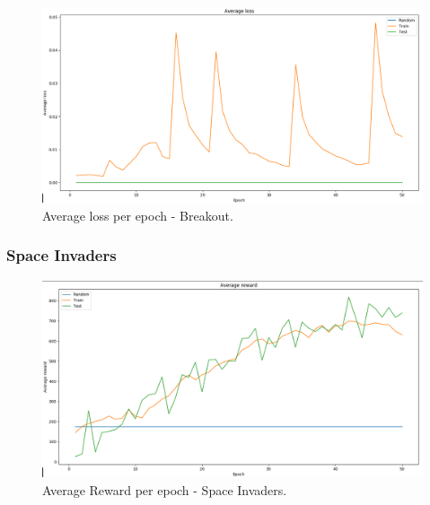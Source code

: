 \documentclass[a4paper,11pt]{report}
\begin{document}
			\begin{figure}[H]
				\begin{centering}
					\includegraphics[width=15cm]{images/breakout_4_averageloss.png}
					\caption{Average loss per epoch - Breakout.}
				\end{centering}
			\end{figure}			
			
			\newpage
			\subsubsection{Space Invaders}

			\begin{figure}[H]
				\begin{centering}
					\includegraphics[width=15cm]{images/space_1_average_reward.png}
					\caption{Average Reward per epoch - Space Invaders.}
				\end{centering}
			\end{figure}			
			
\end{document}
